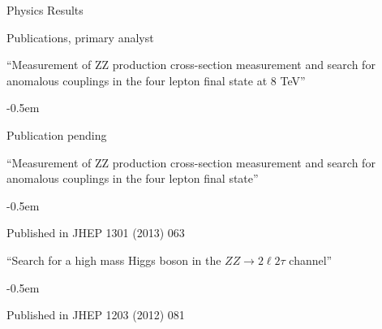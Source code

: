 \documentclass{resume} %
\begin{document}
\begin{rSection}{Physics Results}

\begin{rSubsection}{Publications, primary analyst}{}{}{}
\item ``Measurement of ZZ production cross-section measurement and search for
anomalous couplings in the four lepton final state at 8 TeV''
    \begin{list}{}{\leftmargin=1.5em} 
      \itemsep -0.5em \vspace{-0.5em} %
      \item Publication pending
    \end{list}
\item ``Measurement of ZZ production cross-section measurement and search for
anomalous couplings in the four lepton final state''
    \begin{list}{}{\leftmargin=1.5em} 
      \itemsep -0.5em \vspace{-0.5em} %
      \item Published in JHEP 1301 (2013) 063
    \end{list}
\item ``Search for a high mass Higgs boson in the $ZZ\rightarrow2\ell2\tau$
channel''
    \begin{list}{}{\leftmargin=1.5em} 
      \itemsep -0.5em \vspace{-0.5em} %
      \item Published in JHEP 1203 (2012) 081
    \end{list}
\end{rSubsection}


\end{rSection}
\end{document}

